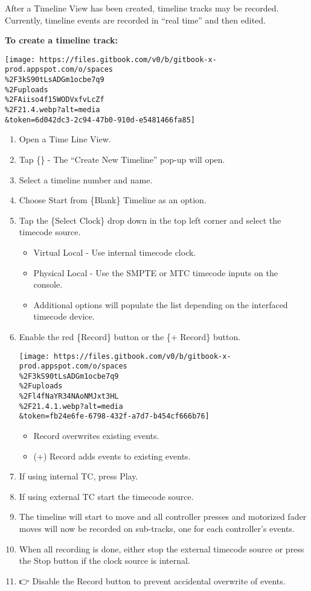 \documentclass[
]{article}
\begin{document}
After a Timeline View has been created, timeline tracks may be recorded. Currently, timeline events are recorded in ``real time'' and then edited.

\textbf{To create a timeline track:}

\texttt{[image: https://files.gitbook.com/v0/b/gitbook-x-prod.appspot.com/o/spaces\\\%2F3kS90tLsADGm1ocbe7q9\\\%2Fuploads\\\%2FAiiso4f15WODVxfvLcZf\\\%2F21.4.webp?alt=media\\\&token=6d042dc3-2c94-47b0-910d-e5481466fa85]}

\begin{enumerate}
\def\labelenumi{\arabic{enumi}.}
\item
  Open a Time Line View.
\item
  Tap \{\href{image.png}{}\} - The ``Create New Timeline'' pop-up will open.
\item
  Select a timeline number and name.
\item
  Choose Start from \{Blank\} Timeline as an option.
\item
  Tap the \{Select Clock\} drop down in the top left corner and select the timecode source.

  \begin{itemize}
  \item
    Virtual Local - Use internal timecode clock.
  \item
    Physical Local - Use the SMPTE or MTC timecode inputs on the console.
  \item
    Additional options will populate the list depending on the interfaced timecode device.
  \end{itemize}
\item
  Enable the red \{Record\} button or the \{+ Record\} button.

  \texttt{[image: https://files.gitbook.com/v0/b/gitbook-x-prod.appspot.com/o/spaces\\\%2F3kS90tLsADGm1ocbe7q9\\\%2Fuploads\\\%2Fl4fNaYR34NAoNMJxt3HL\\\%2F21.4.1.webp?alt=media\\\&token=fb24e6fe-6798-432f-a7d7-b454cf666b76]}

  \begin{itemize}
  \item
    Record overwrites existing events.
  \item
    (+) Record adds events to existing events.
  \end{itemize}
\item
  If using internal TC, press Play.
\item
  If using external TC start the timecode source.
\item
  The timeline will start to move and all controller presses and motorized fader moves will now be recorded on sub-tracks, one for each controller's events.
\item
  When all recording is done, either stop the external timecode source or press the Stop button if the clock source is internal.
\item
  👉 {Disable the Record button to prevent accidental overwrite of events.}
\end{enumerate}
\end{document}
